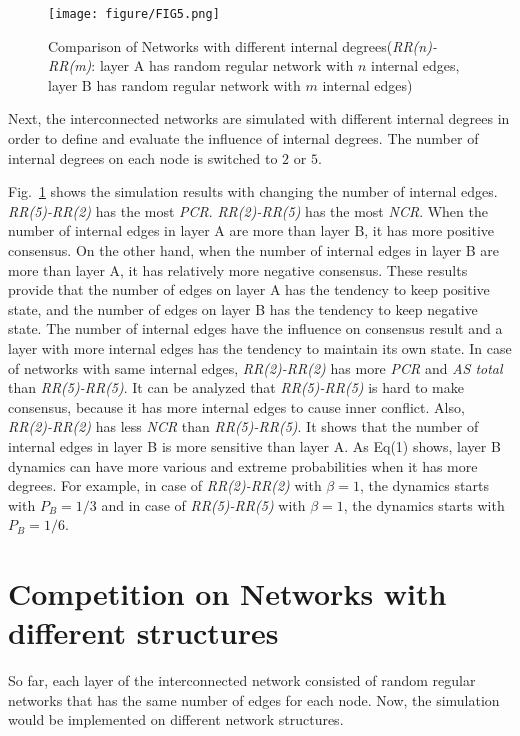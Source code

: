 \begin{figure}[!htb]
	\centering
	\texttt{[image: figure/FIG5.png]}
	\caption{Comparison of Networks with different internal degrees(\textit{RR(n)-RR(m)}: layer A has random regular network with $n$ internal edges, layer B has random regular network with $m$ internal edges)}
	\label{Fig5}
\end{figure}
Next, the interconnected networks are simulated with different internal degrees in order to define and evaluate the influence of internal degrees. The number of internal degrees on each node is switched to $2$ or $5$.

Fig.~\ref{Fig5} shows the simulation results with changing the number of internal edges. \textit{RR(5)-RR(2)} has the most \textit{PCR}. \textit{RR(2)-RR(5)} has the most \textit{NCR}. When the number of internal edges in layer A are more than layer B, it has more positive consensus. On the other hand, when the number of internal edges in layer B are more than layer A, it has relatively more negative consensus. These results provide that the number of edges on layer A has the tendency to keep positive state, and the number of edges on layer B has the tendency to keep negative state. The number of internal edges have the influence on consensus result and a layer with more internal edges has the tendency to maintain its own state. In case of networks with same internal edges, \textit{RR(2)-RR(2)} has more \textit{PCR} and \textit{AS total} than \textit{RR(5)-RR(5)}. It can be analyzed that \textit{RR(5)-RR(5)} is hard to make consensus, because it has more internal edges to cause inner conflict. Also, \textit{RR(2)-RR(2)} has less \textit{NCR} than \textit{RR(5)-RR(5)}. It shows that the number of internal edges in layer B is more sensitive than layer A. As Eq(1) shows, layer B dynamics can have more various and extreme probabilities when it has more degrees. For example, in case of \textit{RR(2)-RR(2)} with $\beta = 1$, the dynamics starts with $P_B=1/3$ and in case of \textit{RR(5)-RR(5)} with $\beta = 1$, the dynamics starts with $P_B=1/6$.    

\section{Competition on Networks with different structures}
So far, each layer of the interconnected network consisted of random regular networks that has the same number of edges for each node. Now, the simulation would be implemented on different network structures. 

